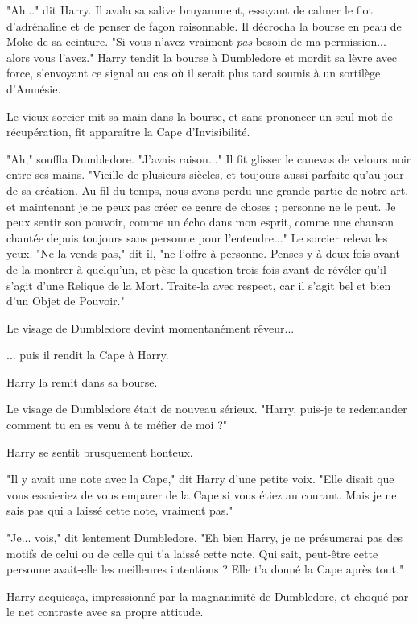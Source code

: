 "Ah..." dit Harry. Il avala sa salive bruyamment, essayant de calmer le flot d'adrénaline et de penser de façon raisonnable. Il décrocha la bourse en peau de Moke de sa ceinture. "Si vous n'avez vraiment \emph{pas}  besoin de ma permission... alors vous l'avez." Harry tendit la bourse à Dumbledore et mordit sa lèvre avec force, s'envoyant ce signal au cas où il serait plus tard soumis à un sortilège d'Amnésie.

Le vieux sorcier mit sa main dans la bourse, et sans prononcer un seul mot de récupération, fit apparaître la Cape d'Invisibilité.

"Ah," souffla Dumbledore. "J'avais raison..." Il fit glisser le canevas de velours noir entre ses mains. "Vieille de plusieurs siècles, et toujours aussi parfaite qu'au jour de sa création. Au fil du temps, nous avons perdu une grande partie de notre art, et maintenant je ne peux pas créer ce genre de choses ; personne ne le peut. Je peux sentir son pouvoir, comme un écho dans mon esprit, comme une chanson chantée depuis toujours sans personne pour l'entendre..." Le sorcier releva les yeux. "Ne la vends pas," dit-il, "ne l'offre à personne. Penses-y à deux fois avant de la montrer à quelqu'un, et pèse la question trois fois avant de révéler qu'il s'agit d'une Relique de la Mort. Traite-la avec respect, car il s'agit bel et bien d'un Objet de Pouvoir."

Le visage de Dumbledore devint momentanément rêveur...

... puis il rendit la Cape à Harry.

Harry la remit dans sa bourse.

Le visage de Dumbledore était de nouveau sérieux. "Harry, puis-je te redemander comment tu en es venu à te méfier de moi ?"

Harry se sentit brusquement honteux.

"Il y avait une note avec la Cape," dit Harry d'une petite voix. "Elle disait que vous essaieriez de vous emparer de la Cape si vous étiez au courant. Mais je ne sais pas qui a laissé cette note, vraiment pas."

"Je... vois," dit lentement Dumbledore. "Eh bien Harry, je ne présumerai pas des motifs de celui ou de celle qui t'a laissé cette note. Qui sait, peut-être cette personne avait-elle les meilleures intentions ? Elle t'a donné la Cape après tout."

Harry acquiesça, impressionné par la magnanimité de Dumbledore, et choqué par le net contraste avec sa propre attitude.

